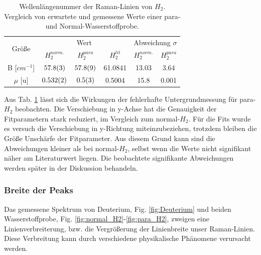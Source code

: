 \documentclass[11 pt]{article}
\begin{document}
\begin{table}[!htbp]
 \begin{center}
  \caption{\small Wellenlängenummer der Raman-Linien von $H_2$. Vergleich von erwartete und gemessene Werte einer para- und Normal-Wasserstoffprobe.}
  \label{tab:H2_B_mu}
  \renewcommand{\arraystretch}{1.3} %
  \begin{tabular}{|c|c|c|c|c|c|}
  \hline

\multirow{2}{*}{Größe}&\multicolumn{3}{c|}{Wert}& \multicolumn{2}{c|}{ Abweichung $\sigma$} \\ \cline{2-6} %
 					 &$H_2^{norm.}$	&	$H_2^{para}$ &  $H_2^{lit}$ &  $H_2^{norm.}$	&	$H_2^{para}$\\ 
  \hline
	\hline 
B [$\unit{cm^{-1}}$] & $\num{57.8\pm0.3}$ & $\num{57.8\pm0.9}$ & 61.0841 & 13.03 & 3.64 \\
$\mu$ [$\unit{\atomicmassunit}$] & $\num{0.532\pm0.002}$& $\num{0.5\pm0.3}$&0.5004 &15.8 & 0.001\\
	\hline
  \end{tabular}
  \renewcommand{\arraystretch}{1}
 \end{center}
\end{table}

Aus Tab. \ref{tab:H2_B_mu} lässt sich die Wirkungen der fehlerhafte Untergrundmessung für para-$H_2$ beobachten. Die Verschiebung in y-Achse hat die Genauigkeit der Fitparametern stark reduziert, im Vergleich zum normal-$H_2$. Für die Fits wurde es versuch die Verschiebung in y-Richtung miteinzubeziehen, trotzdem bleiben die Größe Unschärfe der Fitparameter. Aus diesem Grund kann sind die Abweichungen kleiner als bei normal-$H_2$, selbst wenn die Werte nicht signifikant näher am Literaturwert liegen. Die beobachtete signifikante Abweichungen werden später in der Diskussion behandeln. 



\subsubsection{Breite der Peaks}

Das gemessene Spektrum von Deuterium, Fig. \ref{fig:Deuterium} und beiden Wasserstoffprobe, Fig. \ref{fig:normal_H2}-\ref{fig:para_H2}, zweigen eine Linienverbreiterung, bzw. die Vergrößerung der Linienbreite unser Raman-Linien. Diese Verbreitung kann durch verschiedene physikalische Phänomene verursacht werden.
\end{document}
